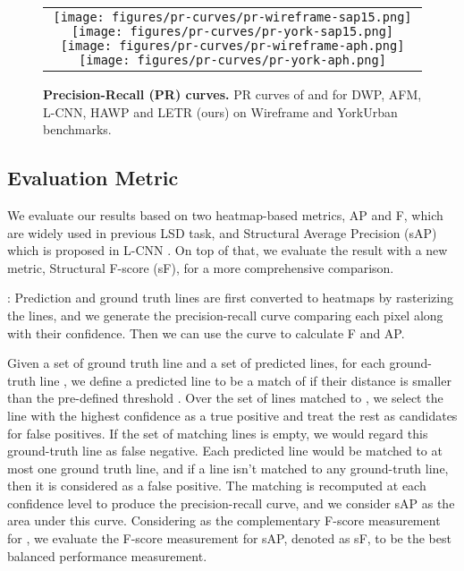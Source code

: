 \documentclass[final]{cvpr}
\begin{document}
\begin{figure*}[!htp]
\vspace{-3mm}
\begin{center}
\begin{tabular}{c}
\texttt{[image: figures/pr-curves/pr-wireframe-sap15.png]}
\texttt{[image: figures/pr-curves/pr-york-sap15.png]}
\texttt{[image: figures/pr-curves/pr-wireframe-aph.png]}
\texttt{[image: figures/pr-curves/pr-york-aph.png]}
\end{tabular}
\caption{\small \textbf{Precision-Recall (PR) curves.} PR curves of  and  for DWP\cite{huang2018learning}, AFM\cite{xue2019learning}, L-CNN\cite{zhou2019end}, HAWP\cite{xue2020holistically} and LETR (ours) on Wireframe and YorkUrban benchmarks. }
\label{fig:PR}
\vspace{-8mm}
\end{center}
\end{figure*}

\subsection{Evaluation Metric}
\vspace{-2mm}
We evaluate our results based on two heatmap-based metrics, AP and F, which are widely used in previous LSD task\cite{zhou2019end, huang2018learning}, and Structural Average Precision (sAP) which is proposed in L-CNN \cite{zhou2019end}. On top of that, we evaluate the result with a new metric, Structural F-score (sF), for a more comprehensive comparison. 

: Prediction and ground truth lines are first converted to heatmaps by rasterizing the lines, and we generate the precision-recall curve comparing each pixel along with their confidence. Then we can use the curve to calculate F and AP.


 Given a set of ground truth line and a set of predicted lines, for each ground-truth line , we define a predicted line  to be a match of  if their  distance is smaller than the pre-defined threshold . Over the set of lines matched to , we select the line with the highest confidence as a true positive and treat the rest as candidates for false positives. If the set of matching lines is empty, we would regard this ground-truth line as false negative. Each predicted line would be matched to at most one ground truth line, and if a line isn't matched to any ground-truth line, then it is considered as a false positive. The matching is recomputed at each confidence level to produce the precision-recall curve, and we consider sAP as the area under this curve. Considering  as the complementary F-score measurement for , we evaluate the F-score measurement for sAP, denoted as sF, to be the best balanced performance measurement.
\end{document}
